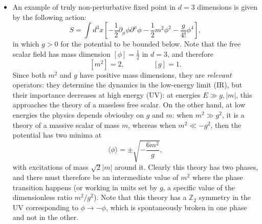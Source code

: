 \documentclass[a4paper,12pt]{article}
\numberwithin{equation}{section}
\begin{document}
\begin{itemize}
\item
An example of truly non-perturbative fixed point in $d = 3$ dimensions is given by the following action:
\begin{equation}
	S = \int d^3x \left[
	-\frac{1}{2} \partial_\mu \phi \partial^\mu \phi
	- \frac{1}{2} m^2 \phi^2 - \frac{g}{4!} \phi^4 \right],
\end{equation}
in which $g > 0$ for the potential to be bounded below.
Note that the free scalar field has mass dimension $\left[ \phi \right] = \frac{1}{2}$ in $d = 3$, and therefore
\begin{equation}
	\left[ m^2 \right] = 2,
	\qquad\qquad
	\left[ g \right] = 1.
\end{equation}
Since both $m^2$ and $g$ have positive mass dimensions, they are \emph{relevant} operators: they determine the dynamics in the low-energy limit (IR), but their importance decreases at high energy (UV): at energies $E \gg g, |m|$, this approaches the theory of a massless free scalar.
On the other hand, at low energies the physics depends obvioulsy on $g$ and $m$: when $m^2 \gg g^2$, it is a theory of a massive scalar of mass $m$, whereas when $m^2 \ll -g^2$, then the potential has two minima at
\begin{equation}
	\langle \phi \rangle = \pm \sqrt{- \frac{6m^2}{g}},
\end{equation}
with excitations of mass $\sqrt{2} |m|$ around it. Clearly this theory has two phases, and there must therefore be an intermediate value of $m^2$ where the phase transition happens (or working in units set by $g$, a specific value of the dimensionless ratio $m^2/g^2$). Note that this theory has a $\mathbb{Z}_2$ symmetry in the UV corresponding to $\phi \to -\phi$, which is spontaneously broken in one phase and not in the other.


\end{itemize}
\end{document}

